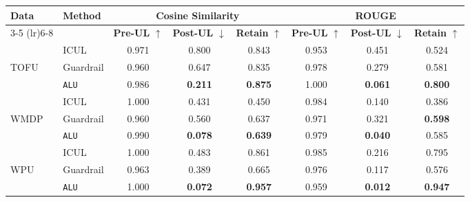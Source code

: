 \begin{table*}[]
    \centering
    \caption{Comparison of Methods using Cosine Similarity and ROUGE Metrics with phi-3-medium-128k}
    \begin{tabular}{llccc|ccc}
        \toprule
        \textbf{Data}&\textbf{Method} & \multicolumn{3}{c}{\textbf{Cosine Similarity}} & \multicolumn{3}{c}{\textbf{ROUGE}} \\
        \cmidrule(lr){3-5} \cmidrule(lr){6-8}
         & & \textbf{Pre-UL} $\uparrow$ & \textbf{Post-UL} $\downarrow$ & \textbf{Retain} $\uparrow$ & \textbf{Pre-UL} $\uparrow$ & \textbf{Post-UL} $\downarrow$ & \textbf{Retain} $\uparrow$ \\
        \midrule
        &ICUL & 0.971 & 0.800 & 0.843 & 0.953 & 0.451 & 0.524 \\
        TOFU &Guardrail & 0.960 & 0.647 & 0.835 & 0.978 & 0.279 & 0.581 \\
        &\texttt{ALU}  & 0.986 & \textbf{0.211} & \textbf{0.875} & 1.000 & \textbf{0.061} & \textbf{0.800} \\
        \midrule
        &ICUL  & 1.000 & 0.431 & 0.450 & 0.984 & 0.140 & 0.386 \\
        WMDP & Guardrail  & 0.960  & 0.560 & 0.637 & 0.971 & 0.321 & \textbf{0.598} \\
        &\texttt{ALU} & 0.990  & \textbf{0.078} & \textbf{0.639} & 0.979 & \textbf{0.040} & 0.585 \\
        \midrule
        &ICUL  & 1.000 & 0.483 & 0.861 & 0.985 & 0.216 & 0.795 \\
        WPU &Guardrail & 0.963 & 0.389 & 0.665 & 0.976 & 0.117 & 0.576 \\
        &\texttt{ALU} & 1.000 & \textbf{0.072} & \textbf{0.957} & 0.959 & \textbf{0.012 }&\textbf{ 0.947} \\
        
        \bottomrule
    \end{tabular}
\label{tab:t15}    
\end{table*}

